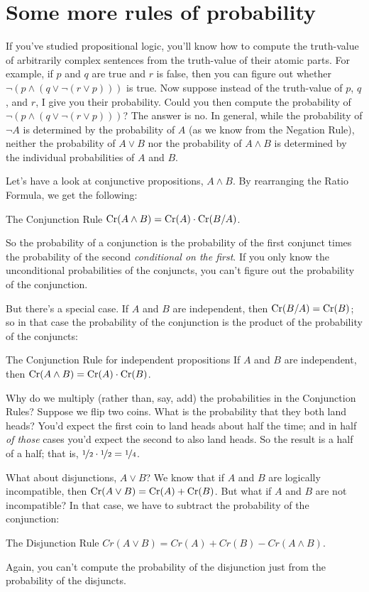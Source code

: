 \section{Some more rules of probability}

If you've studied propositional logic, you'll know how to compute the
truth-value of arbitrarily complex sentences from the truth-value of
their atomic parts. For example, if $p$ and $q$ are true and $r$ is
false, then you can figure out whether
$\neg(p \land (q \lor \neg(r \lor p)))$ is true. Now suppose instead
of the truth-value of $p$, $q$, and $r$, I give you their probability.
Could you then compute the probability of
$\neg (p \land (q \lor \neg(r \lor p)))$? The answer is no. In
general, while the probability of $\neg A$ is determined by the
probability of $A$ (as we know from the Negation Rule), neither the
probability of $A\lor B$ nor the probability of $A \land B$ is
determined by the individual probabilities of $A$ and $B$.

Let's have a look at conjunctive propositions, $A \land B$. By
rearranging the Ratio Formula, we get the following:
%
\begin{genericthm}{The Conjunction Rule}
  $\text{Cr}(A \land B) = \text{Cr}(A) \cdot \text{Cr}(B / A)$.
\end{genericthm}
%
So the probability of a conjunction is the probability of the first
conjunct times the probability of the second \emph{conditional on the
  first}. If you only know the unconditional probabilities of the
conjuncts, you can't figure out the probability of the conjunction.

But there's a special case. If $A$ and $B$ are independent,
then $\text{Cr}(B/A) = \text{Cr}(B)$; so in that case the probability of the
conjunction is the product of the probability of the conjuncts:
%
\begin{genericthm}{The Conjunction Rule for independent propositions}
  If $A$ and $B$ are independent, then $\text{Cr}(A \land B) = \text{Cr}(A) \cdot
  \text{Cr}(B)$.
\end{genericthm}

Why do we multiply (rather than, say, add) the probabilities in the
Conjunction Rules? Suppose we flip two coins. What is the probability
that they both land heads? You'd expect the first coin to land heads
about half the time; and in half \emph{of those} cases you'd expect
the second to also land heads. So the result is a half of a half; that
is, $\nicefrac{1}{2} \cdot \nicefrac{1}{2} = \nicefrac{1}{4}$.

What about disjunctions, $A \lor B$? We know that if $A$ and $B$ are
logically incompatible, then $\text{Cr}(A \lor B) = \text{Cr}(A) + \text{Cr}(B)$. But
what if $A$ and $B$ are not incompatible? In that case, we have to
subtract the probability of the conjunction:
%
\begin{genericthm}{The Disjunction Rule}
  $Cr(A \lor B) = Cr(A) + Cr(B) - Cr(A\land B)$.
\end{genericthm}
%
Again, you can't compute the probability of the disjunction just from
the probability of the disjuncts.

